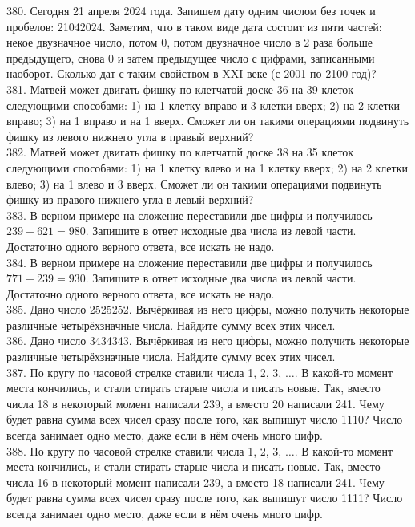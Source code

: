 \documentclass[12pt]{article}
\begin{document}
380.  Сегодня 21 апреля 2024 года. Запишем дату одним числом без точек и пробелов: 21042024.
Заметим, что в таком виде дата состоит из пяти частей: некое двузначное число, потом 0, потом
двузначное число в 2 раза больше предыдущего, снова 0 и затем предыдущее число с цифрами,
записанными наоборот. Сколько дат с таким свойством в XXI веке (с 2001 по 2100 год)?\\
381. Матвей может двигать фишку по клетчатой доске 36 на 39 клеток следующими способами:
1) на 1 клетку вправо и 3 клетки вверх; 2) на 2 клетки вправо; 3) на 1 вправо и на 1 вверх.
Сможет ли он такими операциями подвинуть фишку из левого нижнего угла в правый верхний?\\
382.  Матвей может двигать фишку по клетчатой доске 38 на 35 клеток следующими способами:
1) на 1 клетку влево и на 1 клетку вверх; 2) на 2 клетки влево; 3) на 1 влево и 3 вверх.
Сможет ли он такими операциями подвинуть фишку из правого нижнего угла в левый верхний?\\
383. В верном примере на сложение переставили две цифры и получилось $239+621=980.$ Запишите в ответ исходные два числа из левой части. Достаточно одного верного ответа, все искать не надо.\\
384. В верном примере на сложение переставили две цифры и получилось $771+239=930.$ Запишите в ответ исходные два числа из левой части. Достаточно одного верного ответа, все искать не надо.\\
385. Дано число 2525252. Вычёркивая из него цифры, можно получить некоторые различные четырёхзначные числа. Найдите сумму всех этих чисел.\\
386. Дано число 3434343. Вычёркивая из него цифры, можно получить некоторые различные четырёхзначные числа. Найдите сумму всех этих чисел.\\
387. По кругу по часовой стрелке ставили числа 1, 2, 3, $\ldots.$ В какой-то момент места кончились, и стали стирать старые числа и писать новые. Так, вместо числа 18 в некоторый момент написали 239, а вместо 20 написали 241. Чему будет равна сумма всех чисел сразу после того, как выпишут число 1110? Число всегда занимает одно место, даже если в нём очень много цифр.\\
388. По кругу по часовой стрелке ставили числа 1, 2, 3, $\ldots.$ В какой-то момент места кончились, и стали стирать старые числа и писать новые. Так, вместо числа 16 в некоторый момент написали 239, а вместо 18 написали 241. Чему будет равна сумма всех чисел сразу после того, как выпишут число 1111? Число всегда занимает одно место, даже если в нём очень много цифр.\\
\end{document}
